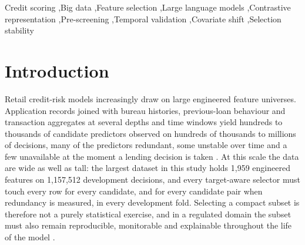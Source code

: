 \documentclass[final,5p,twocolumn]{elsarticle}
\begin{document}
\begin{frontmatter}
\begin{keyword}
Credit scoring \sep Big data \sep Feature selection \sep Large language models \sep Contrastive representation \sep Pre-screening \sep Temporal validation \sep Covariate shift \sep Selection stability
\end{keyword}

\end{frontmatter}


\section{Introduction}
\label{sec:introduction}

Retail credit-risk models increasingly draw on large engineered feature universes. Application records joined with bureau histories, previous-loan behaviour and transaction aggregates at several depths and time windows yield hundreds to thousands of candidate predictors observed on hundreds of thousands to millions of decisions, many of the predictors redundant, some unstable over time and a few unavailable at the moment a lending decision is taken \cite{thomas2002,siddiqi2006}. At this scale the data are wide as well as tall: the largest dataset in this study holds 1,959 engineered features on 1,157,512 development decisions, and every target-aware selector must touch every row for every candidate, and for every candidate pair when redundancy is measured, in every development fold. Selecting a compact subset is therefore not a purely statistical exercise, and in a regulated domain the subset must also remain reproducible, monitorable and explainable throughout the life of the model \cite{lessmann2015,gunnarsson2021,ballegeer2025}.
\end{document}
